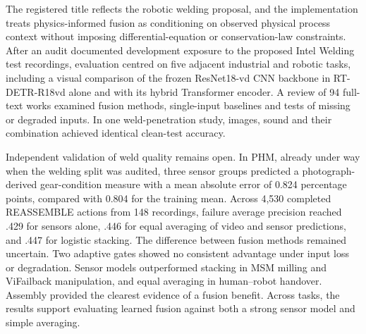 The registered title reflects the robotic welding proposal, and the implementation treats physics-informed fusion as conditioning on observed physical process context without imposing differential-equation or conservation-law constraints. After an audit documented development exposure to the proposed Intel Welding test recordings, evaluation centred on five adjacent industrial and robotic tasks, including a visual comparison of the frozen ResNet18-vd CNN backbone in RT-DETR-R18vd alone and with its hybrid Transformer encoder. A review of 94 full-text works examined fusion methods, single-input baselines and tests of missing or degraded inputs. In one weld-penetration study, images, sound and their combination achieved identical clean-test accuracy.

Independent validation of weld quality remains open. In PHM, already under way when the welding split was audited, three sensor groups predicted a photograph-derived gear-condition measure with a mean absolute error of 0.824 percentage points, compared with 0.804 for the training mean. Across 4,530 completed REASSEMBLE actions from 148 recordings, failure average precision reached .429 for sensors alone, .446 for equal averaging of video and sensor predictions, and .447 for logistic stacking. The difference between fusion methods remained uncertain. Two adaptive gates showed no consistent advantage under input loss or degradation. Sensor models outperformed stacking in MSM milling and ViFailback manipulation, and equal averaging in human–robot handover. Assembly provided the clearest evidence of a fusion benefit. Across tasks, the results support evaluating learned fusion against both a strong sensor model and simple averaging.

